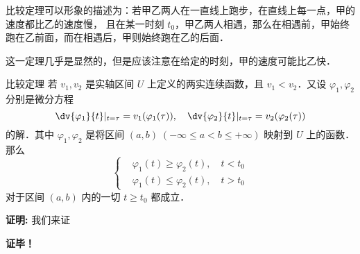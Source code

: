 比较定理可以形象的描述为：若甲乙两人在一直线上跑步，在直线上每一点，甲的速度都比乙的速度慢， 且在某一时刻 $t_0$，甲乙两人相遇，那么在相遇前，甲始终跑在乙前面，而在相遇后，甲则始终跑在乙的后面．

这一定理几乎是显然的，但是应该注意在给定的时刻，甲的速度可能比乙快．
\begin{theorem}{比较定理}
若 $v_1,v_2$ 是实轴区间 $U$ 上定义的两实连续函数，且 $v_1<v_2$．又设 $\varphi_1,\varphi_2$ 分别是微分方程
\begin{equation}
\dv{\varphi_1}{t}|_{t=\tau}=v_1(\varphi_1(\tau)), \quad \dv{\varphi_2}{t}|_{t=\tau}=v_2(\varphi_2(\tau))
\end{equation}
的解．其中 $\varphi_1,\varphi_2$ 是将区间 $(a,b)\;(-\infty\leq a<b\leq+\infty)$ 映射到 $U$ 上的函数．那么
\begin{equation}\label{CompT_eq1}
\left\{\begin{aligned}
    &\varphi_1(t)\geq\varphi_2(t),\quad t<t_0\\
    &\varphi_1(t)\leq\varphi_2(t),\quad t>t_0
\end{aligned}\right.
\end{equation}
对于区间 $(a,b)$ 内的一切 $t\geq t_0$ 都成立．
\end{theorem} 
\textbf{证明:}
我们来证

\textbf{证毕！}
